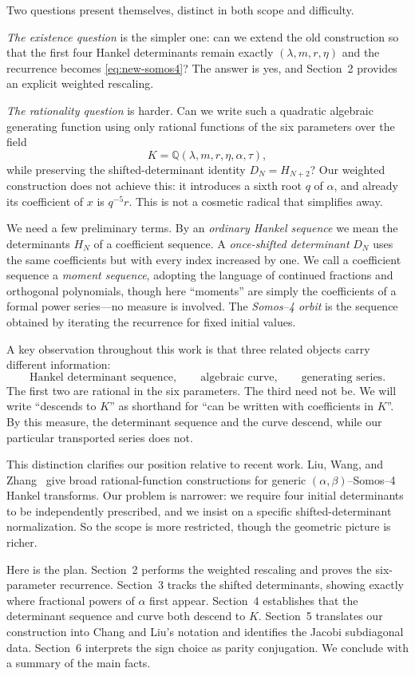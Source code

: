 \documentclass[11pt]{article}
\theoremstyle{definition}
\theoremstyle{remark}
\newcommand{\Q}{\mathbb{Q}}
\begin{document}
Two questions present themselves, distinct in both scope and difficulty.

\emph{The existence question} is the simpler one: can we extend the old
construction so that the first four Hankel determinants remain exactly
$(\lambda,m,r,\eta)$ and the recurrence becomes \eqref{eq:new-somos4}?  The
answer is yes, and Section~2 provides an explicit weighted rescaling.

\emph{The rationality question} is harder. Can we write such a quadratic
algebraic generating function using only rational functions of the six
parameters over the field
\[
 K=\Q(\lambda,m,r,\eta,\alpha,\tau),
\]
while preserving the shifted-determinant identity $D_N=H_{N+2}$?  Our
weighted construction does not achieve this: it introduces a sixth root $q$ of
$\alpha$, and already its coefficient of $x$ is $q^{-5}r$. This is not a
cosmetic radical that simplifies away.

We need a few preliminary terms. By an \emph{ordinary Hankel sequence} we mean
the determinants $H_N$ of a coefficient sequence. A \emph{once-shifted
determinant} $D_N$ uses the same coefficients but with every index increased by
one. We call a coefficient sequence a \emph{moment sequence}, adopting the
language of continued fractions and orthogonal polynomials, though here
``moments'' are simply the coefficients of a formal power series—no measure is
involved. The \emph{Somos--4 orbit} is the sequence obtained by iterating the
recurrence for fixed initial values.

A key observation throughout this work is that three related objects carry
different information:
\[
 \text{Hankel determinant sequence},\qquad
 \text{algebraic curve},\qquad
 \text{generating series}.
\]
The first two are rational in the six parameters. The third need not be. We will
write ``descends to $K$'' as shorthand for ``can be written with coefficients in
$K$''. By this measure, the determinant sequence and the curve descend, while
our particular transported series does not.

This distinction clarifies our position relative to recent work. Liu, Wang, and
Zhang~\cite{LiuWangZhang2026} give broad rational-function constructions for
generic $(\alpha,\beta)$--Somos--4 Hankel transforms. Our problem is narrower:
we require four initial determinants to be independently prescribed, and we
insist on a specific shifted-determinant normalization. So the scope is more
restricted, though the geometric picture is richer.

Here is the plan. Section~2 performs the weighted rescaling and proves the
six-parameter recurrence. Section~3 tracks the shifted determinants, showing
exactly where fractional powers of $\alpha$ first appear. Section~4 establishes
that the determinant sequence and curve both descend to $K$. Section~5
translates our construction into Chang and Liu's notation and identifies the
Jacobi subdiagonal data. Section~6 interprets the sign choice as parity
conjugation. We conclude with a summary of the main facts.
\end{document}
